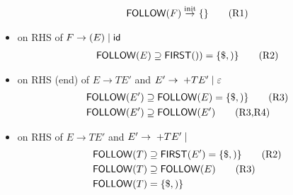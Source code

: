 \documentclass[10pt,a4paper,landscape]{article}
\begin{document}
\begin{multicols*}{3}
\begin{itemize}
\begin{align*}
    \mathsf{FOLLOW}(F) &\overset{\text{init}}{\to} \{\} \tag{R1} \\
  \end{align*}
\item {} on RHS of $F\to (E)\;|\; \mathsf{id}$
  \begin{align*}
    \mathsf{FOLLOW}(E) \supseteq \mathsf{FIRST}(\mathtt{)}) = \{\$, )\} \tag{R2}
  \end{align*}
\item {} on RHS (end) of $E\to TE'$ and $E'\to\; + TE' \;|\; \varepsilon$
  \begin{align*}
    \mathsf{FOLLOW}(E') &\supseteq \mathsf{FOLLOW}(E) = \{\$, )\} \tag{R3} \\
    \mathsf{FOLLOW}(E') &\supseteq \mathsf{FOLLOW}(E') \tag{R3,R4} \\
  \end{align*}
\item {} on RHS of $E\to TE'$ and $E'\to\; +TE' \;|\; $
  \begin{align*}
    \mathsf{FOLLOW}(T) &\supseteq \mathsf{FIRST}(E') = \{\$, )\} \tag{R2} \\
    \mathsf{FOLLOW}(T) &\supseteq \mathsf{FOLLOW}(E) \tag{R3} \\
    \mathsf{FOLLOW}(T) &= \{\$, )\}
  \end{align*}
\end{itemize}
\end{multicols*}
\end{document}
